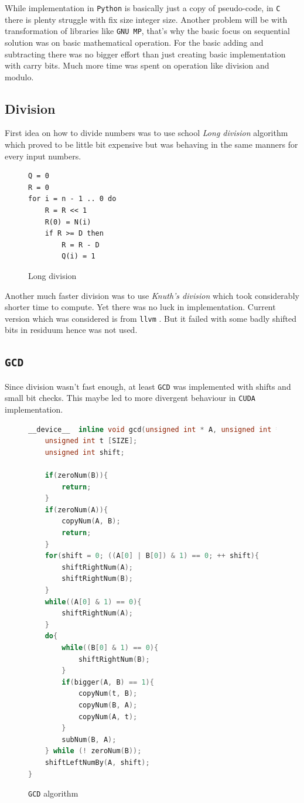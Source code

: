 \documentclass[a4paper]{article}
\begin{document}
While implementation in \texttt{Python} is basically just a copy of pseudo-code, in \texttt{C} there is plenty struggle with fix size integer size. Another problem will be with transformation of libraries like \texttt{GNU MP}, that's why the basic focus on sequential solution was on basic mathematical operation. For the basic adding and subtracting there was no bigger effort than just creating basic implementation with carry bits. Much more time was spent on operation like division and modulo.

\subsection{Division}

First idea on how to divide numbers was to use school \emph{Long division} algorithm which proved to be little bit expensive but was behaving in the same manners for every input numbers.

\begin{figure}[H]
	\centering
	\begin{lstlisting}
Q = 0
R = 0                     
for i = n - 1 .. 0 do
    R = R << 1
    R(0) = N(i)
    if R >= D then
        R = R - D
        Q(i) = 1
	\end{lstlisting}
	\caption{Long division \cite{long_div}}
	\label{long_div}
\end{figure}

Another much faster division was to use \emph{Knuth's division} \cite{knuth} which took considerably shorter time to compute. Yet there was no luck in implementation. Current version which was considered is from \texttt{llvm} \cite{llvm}. But it failed with some badly shifted bits in residuum hence was not used.

\subsection{\texttt{GCD}}

Since division wasn't fast enough, at least \texttt{GCD} was implemented with shifts and small bit checks. This maybe led to more divergent behaviour in \texttt{CUDA} implementation.

\begin{figure}[H]
	\centering
	\begin{lstlisting}[language=c,basicstyle=\small]
__device__  inline void gcd(unsigned int * A, unsigned int * B){
    unsigned int t [SIZE];
    unsigned int shift;

    if(zeroNum(B)){
        return;
    }
    if(zeroNum(A)){
        copyNum(A, B);
        return;
    }
    for(shift = 0; ((A[0] | B[0]) & 1) == 0; ++ shift){
        shiftRightNum(A);
        shiftRightNum(B);
    }
    while((A[0] & 1) == 0){
        shiftRightNum(A);
    }
    do{
        while((B[0] & 1) == 0){
            shiftRightNum(B);
        }
        if(bigger(A, B) == 1){
            copyNum(t, B);
            copyNum(B, A);
            copyNum(A, t);
        }
        subNum(B, A);
    } while (! zeroNum(B));
    shiftLeftNumBy(A, shift);
}
	\end{lstlisting}
	\caption{\texttt{GCD} algorithm}
	\label{gcd}
\end{figure}
\end{document}
